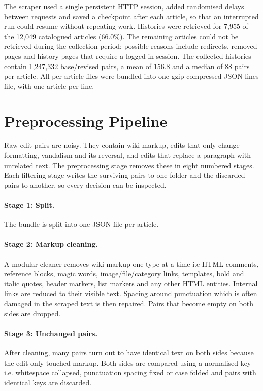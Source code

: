 \documentclass[12pt,a4paper,oneside]{report}
\begin{document}
The scraper used a single persistent HTTP session, added randomised delays between requests and saved a checkpoint after each article, so that an interrupted run could resume without repeating work. Histories were retrieved for 7{,}955 of the 12{,}049 catalogued articles (66.0\%). The remaining articles could not be retrieved during the collection period; possible reasons include redirects, removed pages and history pages that require a logged-in session. The collected histories contain 1{,}247{,}332 base/revised pairs, a mean of 156.8 and a median of 88 pairs per article. All per-article files were bundled into one gzip-compressed JSON-lines file, with one article per line.

\section{Preprocessing Pipeline}
Raw edit pairs are noisy. They contain wiki markup, edits that only change formatting, vandalism and its reversal, and edits that replace a paragraph with unrelated text. The preprocessing stage removes these in eight numbered stages. Each filtering stage writes the surviving pairs to one folder and the discarded pairs to another, so every decision can be inspected.

\paragraph{Stage 1: Split.} The bundle is split into one JSON file per article.

\paragraph{Stage 2: Markup cleaning.} A modular cleaner removes wiki markup one type at a time i.e HTML comments, reference blocks, magic words, image/file/category links, templates, bold and italic quotes, header markers, list markers and any other HTML entities. Internal links are reduced to their visible text. Spacing around punctuation which is often damaged in the scraped text is then repaired. Pairs that become empty on both sides are dropped.

\paragraph{Stage 3: Unchanged pairs.} After cleaning, many pairs turn out to have identical text on both sides because the edit only touched markup. Both sides are compared using a normalised key i.e. whitespace collapsed, punctuation spacing fixed or case folded and pairs with identical keys are discarded.
\end{document}
